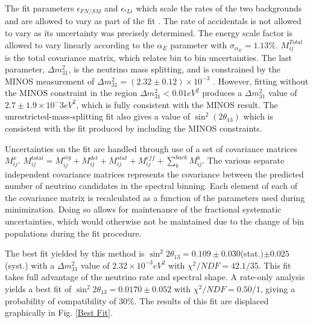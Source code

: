  The fit parameters $\epsilon_{FN/SM}$ and $\epsilon_{^9Li}$ which scale the rates of the two backgrounds and are allowed to vary as part of the fit . The rate of accidentals is not allowed to vary as its uncertainty was precisely determined. The energy scale factor is allowed to vary linearly according to the $\alpha_{E}$ parameter with $\sigma_{\alpha_E} = 1.13\%$. $M^{Total}_{ij}$ is the total covariance matrix, which relates bin to bin uncertainties. The last parameter, $ \Delta m^2_{31}$, is the neutrino mass splitting, and is constrained by the MINOS \cite{MINOS} measurement of $\Delta m^2_{31} = (2.32 \pm 0.12) \times 10^{-3}$ . However, fitting without the MINOS constraint in the region  $\Delta m^2_{31} < 0.01 eV^2$ produces a $\Delta m^2_{31}$ value of $2.7 \pm 1.9 \times 10^-3 eV^2$, which is fully consistent with the MINOS result. The unrestricted-mass-splitting fit also gives a value of $\sin^2 (2 \theta_{13})$ which is consistent with the fit produced by including the MINOS constraints. 
 
 Uncertainties on the fit are handled through use of a set of covariance matrices $M^{x}_{ij}$. $M^{total}_{ij} =  M^{sig}_{ij} + M^{det}_{ij} + M^{stat}_{ij} + M^{eff}_{ij} + \sum_{b}^{back} M^{b}_{ij}$. The various separate independent covariance matrices represents the covariance between the predicted number of neutrino candidates in the spectral binning. Each element of each of the covariance matrix is recalculated as a function of the parameters used during minimization. Doing so allows for maintenance of the fractional systematic uncertainties, which would otherwise not be maintained due to the change of bin populations during the fit procedure. 
 
 The best fit yielded by this method is $\sin^2 2 \theta_{13} = 0.109 \pm 0.030$(stat.)$\pm 0.025$(syst.) with a  $\Delta m^2_{31}$ value of $2.32 \times 10^{-3} eV^2$ with $\chi^2/NDF = 42.1/35$.  This fit takes full advantage of the neutrino rate and spectral shape. A rate-only analysis yields a best fit of $\sin^2 2 \theta_{13} = 0.0170 \pm 0.052$ with $\chi^2/NDF = 0.50/1$, giving a probability of compatibility of 30\%. The results of this fit are displaced graphically in Fig. \ref{Best Fit}.
 
